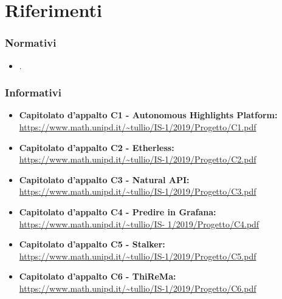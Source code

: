 \section{Riferimenti}

\subsubsection{Normativi}
\begin{itemize}
\item {}.
\end{itemize}

\subsubsection{Informativi}

\begin{itemize}
\item \textbf {Capitolato d'appalto C1 - Autonomous Highlights Platform:}\\
\url{https://www.math.unipd.it/~tullio/IS-1/2019/Progetto/C1.pdf}
\item \textbf {Capitolato d'appalto C2 - Etherless:}\\
\url{https://www.math.unipd.it/~tullio/IS-1/2019/Progetto/C2.pdf}
\item \textbf {Capitolato d'appalto C3 - Natural API:}\\
\url{https://www.math.unipd.it/~tullio/IS-1/2019/Progetto/C3.pdf}
\item \textbf {Capitolato d'appalto C4 - Predire in Grafana:}\\
\url{https://www.math.unipd.it/~tullio/IS- 1/2019/Progetto/C4.pdf}
\item \textbf {Capitolato d'appalto C5 - Stalker:}\\
\url{https://www.math.unipd.it/~tullio/IS-1/2019/Progetto/C5.pdf}
\item \textbf {Capitolato d'appalto C6 - ThiReMa:}\\
\url{https://www.math.unipd.it/~tullio/IS-1/2019/Progetto/C6.pdf}

\end{itemize}
